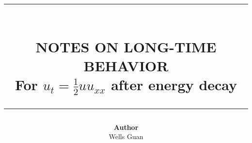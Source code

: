 \documentclass{article}
\newcommand{\HRule}[1]{\rule{\linewidth}{#1}}
\begin{document}
\title{\normalsize \textsc{}\\[2cm]
\HRule{1.5pt}\\
\LARGE \textbf{\uppercase{Notes on Long-Time Behavior}}\\[0.4cm]
\Large For $u_t=\frac12 u u_{xx}$ after energy decay\\
\HRule{2pt}}
\author{\textbf{Author}\\Wells Guan\\}
\date{}
\maketitle
\tableofcontents
\newpage

\end{document}
